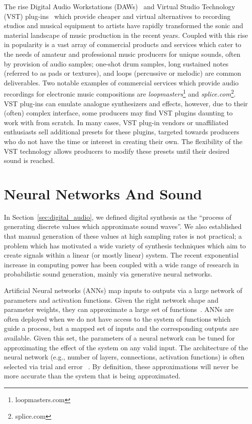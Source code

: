 \documentclass[\main/thesis.tex]{subfiles}
\begin{document}
 The rise Digital Audio Workstations (DAWs)~\cite{leider2004digital} and Virtual Studio Technology (VST) plug-ins~\cite{tanev2013virtual} which provide cheaper and virtual alternatives to recording studios and musical equipment to artists have rapidly transformed the sonic and material landscape of music production in the recent years. Coupled with this rise in popularity is a vast array of commercial products and services which cater to the needs of amateur and professional music producers for unique sounds, often by provision of audio samples; one-shot drum samples, long sustained notes (referred to as pads or textures), and loops (percussive or melodic) are common deliverables. Two notable examples of commercial services which provide audio recordings for electronic music compositions are \textit{loopmasters}\footnote{loopmasters.com} and \textit{splice.com}\footnote{splice.com}. VST plug-ins can emulate analogue synthesizers and effects,  however,  due to their (often) complex interface, some producers may find VST plugins daunting to work with from scratch. In many cases, VST plug-in vendors or unaffiliated enthusiasts sell additional presets for these plugins, targeted towards producers who do not have the time or interest in creating their own. The flexibility of the VST technology allows producers to modify these presets until their desired sound is reached.
 
\section{Neural Networks And Sound}
\label{bg:NN}
In Section~\ref{sec:digital_audio}, we defined digital synthesis as the \enquote{process of generating discrete values which approximate sound waves}. We also established that manual generation of these values at high sampling rates is not practical; a problem which has motivated a wide variety of synthesis techniques which aim to create signals within a linear (or mostly linear) system. The recent exponential increase in computing power has been coupled with a wide range of research in probabilistic sound generation, mainly via generative neural networks. 

Artificial Neural networks (ANNs) map inputs to outputs via a large network of parameters and activation functions. Given the right network shape and parameter weights, they can approximate a large set of functions~\cite{cybenko1989approximation,cardaliaguet1992approximation}. ANNs are often deployed when we do not have access to the system of functions which guide a process, but a mapped set of inputs and the corresponding outputs are available. Given this set, the parameters of a neural network can be tuned for approximating the effect of the system on any valid input. The architecture of the neural network (e.g., number of layers, connections, activation functions) is often selected via trial and error ~\cite{bergstra2012random,bergstra2011algorithms,ba2013adaptive}. By definition, these approximations will never be more accurate than the system that is being approximated. 
\end{document}
